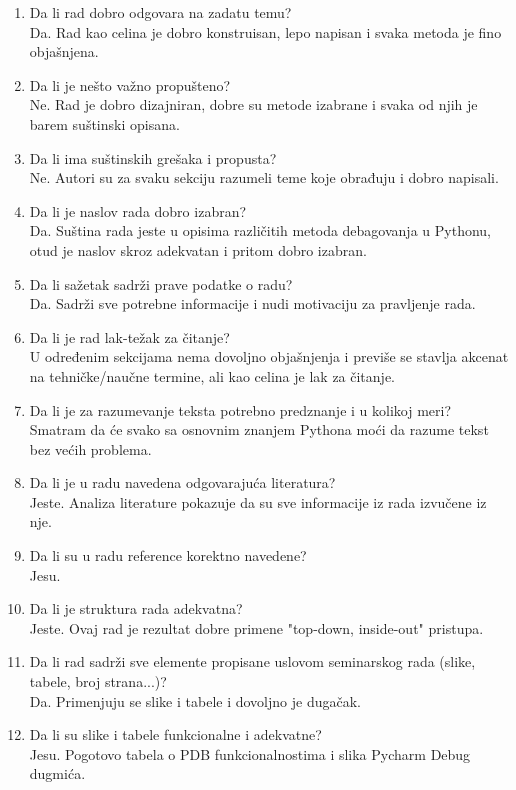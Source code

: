 \documentclass[a4paper]{report}
\begin{document}
\begin{enumerate}
\item Da li rad dobro odgovara na zadatu temu?\\ Da. Rad kao celina je dobro konstruisan, lepo napisan i svaka metoda je fino objašnjena.
\item Da li je nešto važno propušteno?\\ Ne. Rad je dobro dizajniran, dobre su metode izabrane i svaka od njih je barem suštinski opisana.
\item Da li ima suštinskih grešaka i propusta?\\ Ne. Autori su za svaku sekciju razumeli teme koje obrađuju i dobro napisali.
\item Da li je naslov rada dobro izabran?\\ Da. Suština rada jeste u opisima različitih metoda debagovanja u Pythonu, otud je naslov skroz adekvatan i pritom dobro izabran.
\item Da li sažetak sadrži prave podatke o radu?\\ Da. Sadrži sve potrebne informacije i nudi motivaciju za pravljenje rada.
\item Da li je rad lak-težak za čitanje?\\ U određenim sekcijama nema dovoljno objašnjenja i previše se stavlja akcenat na tehničke/naučne termine, ali kao celina je lak za čitanje.
\item Da li je za razumevanje teksta potrebno predznanje i u kolikoj meri?\\ Smatram da će svako sa osnovnim znanjem Pythona moći da razume tekst bez većih problema.
\item Da li je u radu navedena odgovarajuća literatura?\\ Jeste. Analiza literature pokazuje da su sve informacije iz rada izvučene iz nje.
\item Da li su u radu reference korektno navedene?\\ Jesu. 
\item Da li je struktura rada adekvatna?\\ Jeste. Ovaj rad je rezultat dobre primene "top-down, inside-out" pristupa.
\item Da li rad sadrži sve elemente propisane uslovom seminarskog rada (slike, tabele, broj strana...)?\\ Da. Primenjuju se slike i tabele i dovoljno je dugačak.
\item Da li su slike i tabele funkcionalne i adekvatne?\\ Jesu. Pogotovo tabela o PDB funkcionalnostima i slika Pycharm Debug dugmića.
\end{enumerate}
\end{document}
